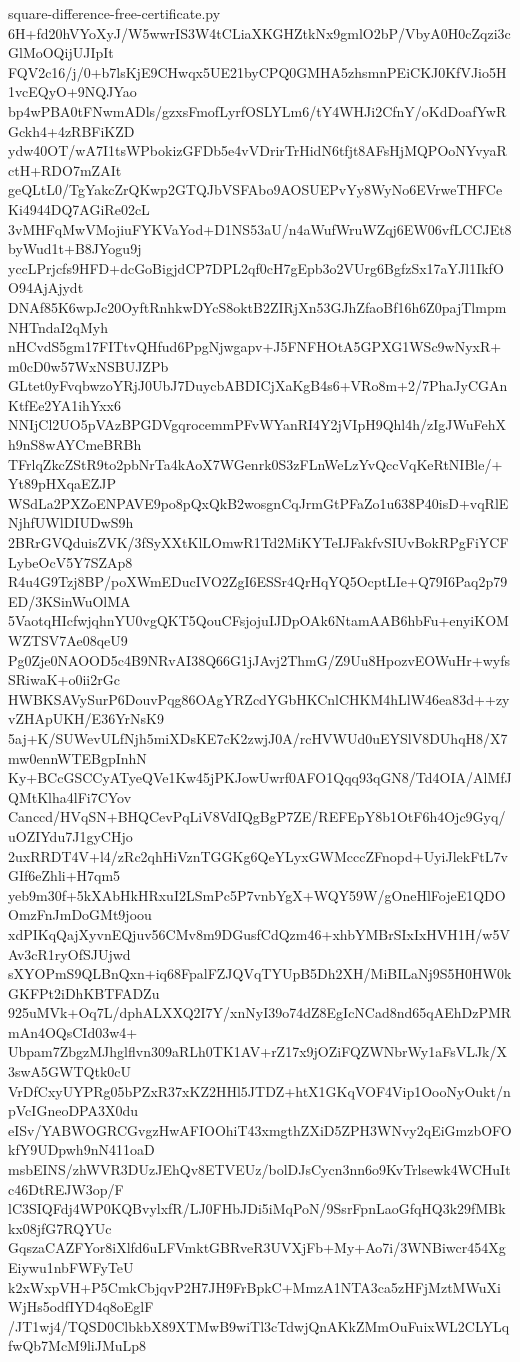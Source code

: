 \documentclass[11pt]{article}
\theoremstyle{definition}
\theoremstyle{remark}
\begin{document}
\begin{filecontents*}[overwrite]{square-difference-free-certificate.py}
6H+fd20hVYoXyJ/W5wwrIS3W4tCLiaXKGHZtkNx9gmlO2bP/VbyA0H0cZqzi3cGlMoOQijUJIpIt
FQV2c16/j/0+b7lsKjE9CHwqx5UE21byCPQ0GMHA5zhsmnPEiCKJ0KfVJio5H1vcEQyO+9NQJYao
bp4wPBA0tFNwmADls/gzxsFmofLyrfOSLYLm6/tY4WHJi2CfnY/oKdDoafYwRGckh4+4zRBFiKZD
ydw40OT/wA7I1tsWPbokizGFDb5e4vVDrirTrHidN6tfjt8AFsHjMQPOoNYvyaRctH+RDO7mZAIt
geQLtL0/TgYakcZrQKwp2GTQJbVSFAbo9AOSUEPvYy8WyNo6EVrweTHFCeKi4944DQ7AGiRe02cL
3vMHFqMwVMojiuFYKVaYod+D1NS53aU/n4aWufWruWZqj6EW06vfLCCJEt8byWud1t+B8JYogu9j
yccLPrjcfs9HFD+dcGoBigjdCP7DPL2qf0cH7gEpb3o2VUrg6BgfzSx17aYJl1IkfOO94AjAjydt
DNAf85K6wpJc20OyftRnhkwDYcS8oktB2ZIRjXn53GJhZfaoBf16h6Z0pajTlmpmNHTndaI2qMyh
nHCvdS5gm17FITtvQHfud6PpgNjwgapv+J5FNFHOtA5GPXG1WSc9wNyxR+m0cD0w57WxNSBUJZPb
GLtet0yFvqbwzoYRjJ0UbJ7DuycbABDICjXaKgB4s6+VRo8m+2/7PhaJyCGAnKtfEe2YA1ihYxx6
NNIjCl2UO5pVAzBPGDVgqrocemmPFvWYanRI4Y2jVIpH9Qhl4h/zIgJWuFehXh9nS8wAYCmeBRBh
TFrlqZkcZStR9to2pbNrTa4kAoX7WGenrk0S3zFLnWeLzYvQccVqKeRtNIBle/+Yt89pHXqaEZJP
WSdLa2PXZoENPAVE9po8pQxQkB2wosgnCqJrmGtPFaZo1u638P40isD+vqRlENjhfUWlDIUDwS9h
2BRrGVQduisZVK/3fSyXXtKlLOmwR1Td2MiKYTeIJFakfvSIUvBokRPgFiYCFLybeOcV5Y7SZAp8
R4u4G9Tzj8BP/poXWmEDucIVO2ZgI6ESSr4QrHqYQ5OcptLIe+Q79I6Paq2p79ED/3KSinWuOlMA
5VaotqHIcfwjqhnYU0vgQKT5QouCFsjojuIJDpOAk6NtamAAB6hbFu+enyiKOMWZTSV7Ae08qeU9
Pg0Zje0NAOOD5c4B9NRvAI38Q66G1jJAvj2ThmG/Z9Uu8HpozvEOWuHr+wyfsSRiwaK+o0ii2rGc
HWBKSAVySurP6DouvPqg86OAgYRZcdYGbHKCnlCHKM4hLlW46ea83d++zyvZHApUKH/E36YrNsK9
5aj+K/SUWevULfNjh5miXDsKE7cK2zwjJ0A/rcHVWUd0uEYSlV8DUhqH8/X7mw0ennWTEBgpInhN
Ky+BCcGSCCyATyeQVe1Kw45jPKJowUwrf0AFO1Qqq93qGN8/Td4OIA/AlMfJQMtKlha4lFi7CYov
Canccd/HVqSN+BHQCevPqLiV8VdIQgBgP7ZE/REFEpY8b1OtF6h4Ojc9Gyq/uOZIYdu7J1gyCHjo
2uxRRDT4V+l4/zRc2qhHiVznTGGKg6QeYLyxGWMcccZFnopd+UyiJlekFtL7vGIf6eZhli+H7qm5
yeb9m30f+5kXAbHkHRxuI2LSmPc5P7vnbYgX+WQY59W/gOneHlFojeE1QDOOmzFnJmDoGMt9joou
xdPIKqQajXyvnEQjuv56CMv8m9DGusfCdQzm46+xhbYMBrSIxIxHVH1H/w5VAv3cR1ryOfSJUjwd
sXYOPmS9QLBnQxn+iq68FpalFZJQVqTYUpB5Dh2XH/MiBILaNj9S5H0HW0kGKFPt2iDhKBTFADZu
925uMVk+Oq7L/dphALXXQ2I7Y/xnNyI39o74dZ8EgIcNCad8nd65qAEhDzPMRmAn4OQsCId03w4+
Ubpam7ZbgzMJhglflvn309aRLh0TK1AV+rZ17x9jOZiFQZWNbrWy1aFsVLJk/X3swA5GWTQtk0cU
VrDfCxyUYPRg05bPZxR37xKZ2HHl5JTDZ+htX1GKqVOF4Vip1OooNyOukt/npVcIGneoDPA3X0du
eISv/YABWOGRCGvgzHwAFIOOhiT43xmgthZXiD5ZPH3WNvy2qEiGmzbOFOkfY9UDpwh9nN411oaD
msbEINS/zhWVR3DUzJEhQv8ETVEUz/bolDJsCycn3nn6o9KvTrlsewk4WCHuItc46DtREJW3op/F
lC3SIQFdj4WP0KQBvylxfR/LJ0FHbJDi5iMqPoN/9SsrFpnLaoGfqHQ3k29fMBkkx08jfG7RQYUc
GqszaCAZFYor8iXlfd6uLFVmktGBRveR3UVXjFb+My+Ao7i/3WNBiwcr454XgEiywu1nbFWFyTeU
k2xWxpVH+P5CmkCbjqvP2H7JH9FrBpkC+MmzA1NTA3ca5zHFjMztMWuXiWjHs5odfIYD4q8oEglF
/JT1wj4/TQSD0ClbkbX89XTMwB9wiTl3cTdwjQnAKkZMmOuFuixWL2CLYLqfwQb7McM9liJMuLp8

\end{filecontents*}
\end{document}

